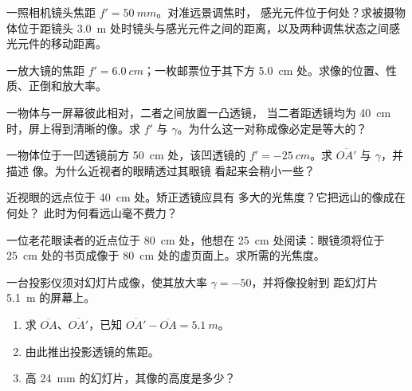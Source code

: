 \begin{exercise}[$\star\star$]\label{exo:g11:lenses-and-eye:6}
一照相机镜头焦距 $f' = \qty{50}{mm}$。对准远景调焦时，
感光元件位于何处？求被摄物体位于距镜头
\qty{3.0}{m} 处时镜头与感光元件之间的距离，以及两种调焦状态之间感光元件的移动距离。
\end{exercise}

\begin{exercise}[$\star\star$]\label{exo:g11:lenses-and-eye:7}
一放大镜的焦距 $f' = \qty{6.0}{cm}$；一枚邮票位于其下方
\qty{5.0}{cm} 处。求像的位置、性质、正倒和放大率。
\end{exercise}

\begin{exercise}[$\star\star$]\label{exo:g11:lenses-and-eye:8}
一物体与一屏幕彼此相对，二者之间放置一凸透镜，
当二者距透镜均为 \qty{40}{cm} 时，屏上得到清晰的像。求
$f'$ 与 $\gamma$。为什么这一对称成像必定是等大的？
\end{exercise}

\begin{exercise}[$\star\star$]\label{exo:g11:lenses-and-eye:9}
一物体位于一凹透镜前方 \qty{50}{cm} 处，该凹透镜的
$f' = \qty{-25}{cm}$。求 $\overline{OA'}$ 与 $\gamma$，并描述
像。为什么近视者的眼睛透过其眼镜
看起来会稍小一些？
\end{exercise}

\begin{exercise}[$\star\star$]\label{exo:g11:lenses-and-eye:10}
近视眼的远点位于 \qty{40}{cm} 处。矫正透镜应具有
多大的光焦度？它把远山的像成在何处？
此时为何看远山毫不费力？
\end{exercise}

\begin{exercise}[$\star\star$]\label{exo:g11:lenses-and-eye:11}
一位老花眼读者的近点位于 \qty{80}{cm} 处，他想在
\qty{25}{cm} 处阅读：眼镜须将位于 \qty{25}{cm} 处的书页成像于
\qty{80}{cm} 处的虚页面上。求所需的光焦度。
\end{exercise}

\begin{exercise}[$\star\star\star$]\label{exo:g11:lenses-and-eye:12}
一台投影仪须对幻灯片成像，使其放大率 $\gamma = -50$，并将像投射到
距幻灯片 \qty{5.1}{m} 的屏幕上。
\begin{enumerate}
  \item 求 $\overline{OA}$、$\overline{OA'}$，已知
        $\overline{OA'} - \overline{OA} = \qty{5.1}{m}$。
  \item 由此推出投影透镜的焦距。
  \item 高 \qty{24}{mm} 的幻灯片，其像的高度是多少？
\end{enumerate}
\end{exercise}

